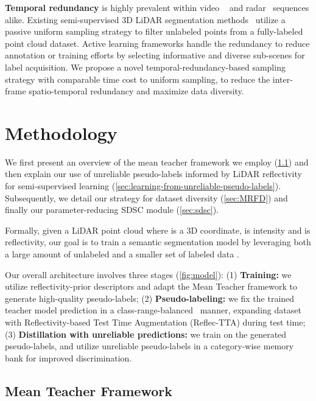 \documentclass[10pt,twocolumn,letterpaper]{article}
\newcommand\bdtitle[1]{\noindent\textbf{#1}}
\begin{document}
\bdtitle{Temporal redundancy} is highly prevalent within video ~\cite{zhu2017deep,wang2022longshort} and radar~\cite{li2022exploiting} sequences alike. Existing semi-supervised 3D LiDAR segmentation methods~\cite{kong2022lasermix,Unal_2022_CVPR} utilize a passive uniform sampling strategy to filter unlabeled points from a fully-labeled point cloud dataset. Active learning frameworks handle the redundancy to reduce annotation or training efforts by selecting informative and diverse sub-scenes for label acquisition\cite{duong2017reducing,hu2022lidal,wu2021redala}.
We propose a novel temporal-redundancy-based sampling strategy with comparable time cost to uniform sampling, 
to reduce the inter-frame spatio-temporal redundancy and maximize data diversity. \vspace{-0.2cm}   
\section{Methodology}
\vspace{-0.2cm}




\noindent
We first present an overview of the mean teacher framework we employ (\cref{sec:mean-teacher}) and then explain our use of unreliable pseudo-labels informed by LiDAR reflectivity for semi-supervised learning (\cref{sec:learning-from-unreliable-pseudo-labels}). Subsequently, we detail our {\samplshort} strategy for dataset diversity (\cref{sec:MRFD}) and finally our parameter-reducing SDSC module (\cref{sec:sdsc}).

Formally, given a LiDAR point cloud  where  is a 3D coordinate,  is intensity and  is reflectivity, our goal is to train a semantic segmentation model by leveraging both a large amount of unlabeled  and a smaller set of labeled data . 


Our overall architecture involves three stages (\cref{fig:model}): (1) \textbf{Training:} we utilize reflectivity-prior descriptors and adapt the Mean Teacher framework to generate high-quality pseudo-labels; (2) \textbf{Pseudo-labeling:} we fix the trained teacher model prediction in a class-range-balanced~\cite{Unal_2022_CVPR} manner, expanding dataset with Reflectivity-based Test Time Augmentation (Reflec-TTA) during test time; (3) \textbf{Distillation with unreliable predictions:} we train on the generated pseudo-labels, and utilize unreliable pseudo-labels in a category-wise memory bank for improved discrimination.


\subsection{Mean Teacher Framework}
\label{sec:mean-teacher}
\end{document}

